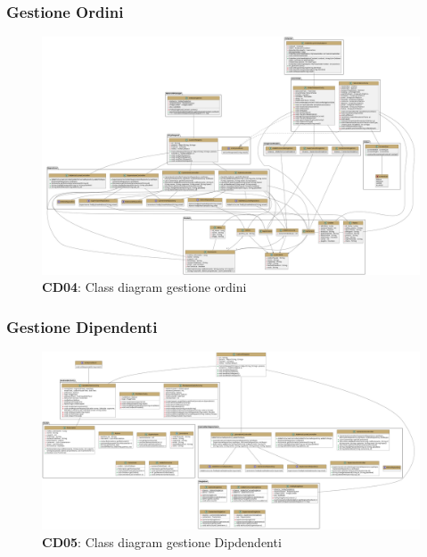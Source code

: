     \subsubsection{Gestione Ordini}
        \begin{figure}[H]
            \centering
            \includegraphics[scale=0.15]{assets/diagrammi/Class diagram di design/Class Diagramm Design Gestione Ordini.png}
            \caption*{\textbf{CD04}: Class diagram gestione ordini}\label{fig:ClassDiagram_ManageOrders}
        \end{figure}

    \subsubsection{Gestione Dipendenti}
        \begin{figure}[H]
            \centering
            \includegraphics[scale=0.15]{assets/diagrammi/Class diagram di design/gestione dipendenti.png}
            \caption*{\textbf{CD05}: Class diagram gestione Dipdendenti}\label{fig:ClassDiagram_ManageWorkers}
        \end{figure}
    
